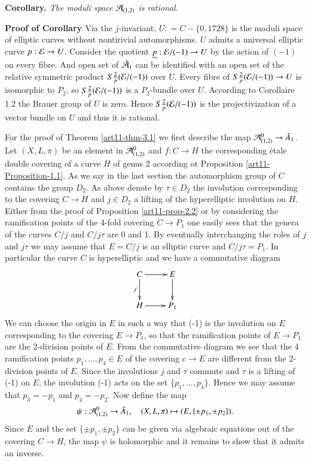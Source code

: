 \medskip
\noindent
{\bfseries {} Corollary. \label{art11-coro-3.2}} \textit{The moduli space $\mathcal{A}_{(1,2)}$ is rational.}


\medskip
\noindent
{\bfseries   Proof of Corollary  \label{art11-Proof of Coro-3.2}} Via the $j$-invariant, $U : = C-\{0,1728\}$ is the moduli space of elliptic curves without nontirivial automorphisms. $U$ admits a universal elliptic curve $p:\mathcal{E} \rightarrow U$. Consider the quotient $\underline{p} : \mathcal{E} /(-1)\rightarrow U$ by the action of $(-1)$ on every fibre. And open set of $\tilde{\mathcal{A}}_{1}$ can be identified with an open set of the relative symmetric product $S\tfrac{2}{p}(\mathcal{E} /(-1))$ over $U$. Every fibre of $S\tfrac{2}{p}(\mathcal{E} /(-1))\rightarrow U$ is isomorphic to $P_{2}$, so $S\tfrac{2}{p}(\mathcal{E} /(-1))$ is a $P_{2}$-bundle over $U$. According to \cite{art11-keyG} Corollaire 1.2 the Brauer group of $U$ is zero. Hence $S\frac{2}{p}(\mathcal{E}/(-1))$ is the projectivization of a vector bundle on $U$ and thus it is rational. 

For the proof of Theorem \ref{art11-thm-3.1} we first describe the map $\mathcal{A}^{0}_{(1,2)} \rightarrow \tilde{A}_{1}$. Let $(X, L, \pi)$ be an element in $\mathcal{A}^{0}_{(1,2)}$ and $f: C \rightarrow H$ the corresponding \'etale double covering of a curve $H$ of genus 2 according ot Proposition \ref{art11-Proposition-1.1}. As we say in the last section the automorphism group of $C$ contains the group $D_{2}$. As above denote by $\tau \in D_{2}$ the involution corresponding to the covering $C \rightarrow H$ and $j \in D_{2}$ a lifting of the hyperelliptic involution on $H$. Either from the proof of Proposition \ref{art11-prop-2.2} or by considering the ramification points of the 4-fold covering $C\rightarrow P_{1}$ one easily sees that the genera of the curves $C/j$ and $C/j\tau$ are 0 and 1. By eventually interchanging the roles of $j$ and $j\tau$ we may assume that $E=C/j$ is an elliptic curve and $C/j\tau = P_{1}$. In particular the curve $C$ is hyperelliptic and we have a commutative diagram
$$
\xymatrix{
C \ar[r] \ar[d]_{f} & E \ar[d]\\
H \ar[r] & P_{1}}  
$$
We can choose the origin in $E$ in such a way that (-1) is the involution on $E$ corresponding to the covering $E \rightarrow P_{1}$, so that the ramification points of $E \rightarrow P_{1}$ are the 2-division points of $E$. From the commutative diagram we see that the 4 ramification points $p_{1}, \ldots, p_{4} \in E$ of the covering $c\rightarrow E$ are different from the 2-division points of $E$. Since the involutions $j$ and $\tau$ commute and $\tau$ is a lifting of (-1) on $E$, the involution (-1) acts on the set $\{p_{1}, \ldots,p_{4}\}$. Hence we may assume that $p_{3} =-p_{1}$ and $p_{4}=-p_{2}$. Now define the map
$$
\psi : \mathcal{A}_{(1,2)}^{0} \rightarrow \tilde{A}_{1}, \quad (X, L, \pi)\mapsto (E, \{\pm p_{1}, \pm p_{2}\}).
$$ 
Since $E$ and the set $\{\pm p_{1}, \pm p_{2}\}$ can be given via algebraic equations out of the covering
$C\rightarrow H$, the map $\psi$ is holomorphic and it remains to show that it admits an inverse.

